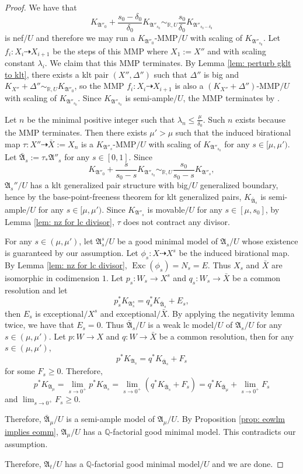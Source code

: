 \documentclass[12pt]{amsart}
\numberwithin{equation}{section}
\newcommand{\Exc}{\operatorname{Exc}}
\newcommand{\Aa}{{\mathfrak{A}}}
\theoremstyle{definition}
\theoremstyle{definition}
\theoremstyle{definition}
\begin{document}
\begin{proof}
We have that $$K_{\Aa''_0}+\frac{s_0-\delta_0}{\delta_0}K_{\Aa''_{s_0}}\sim_{\mathbb R,U}\frac{s_0}{\delta_0}K_{\Aa''_{s_0-\delta_0}}$$
is nef$/U$ and therefore we may
run a
$K_{\Aa''_0}$-MMP$/U$ with scaling of $K_{\Aa''_{s_0}}$. 
  Let $f_i: X_i\dashrightarrow X_{i+1}$ be the steps of this MMP where $X_1:=X''$ and with scaling constant $\lambda_i$. We claim that this MMP terminates. By Lemma \ref{lem: perturb gklt to klt}, there exists a klt pair $(X'',\Delta'')$ such that $\Delta''$ is big and $K_{X''}+\Delta''\sim_{\mathbb R,U}K_{\Aa''_0}$, so the MMP $f_i: X_i\dashrightarrow X_{i+1}$ is also a $(K_{X''}+\Delta'')$-MMP$/U$ with scaling of $K_{\Aa''_{s_0}}$. Since $K_{\Aa''_{s_0}}$ is semi-ample$/U$, the MMP terminates by \cite[Corollary 1.4.2]{BCHM10}.

Let $n$ be the minimal positive integer such that $\lambda_n\leq \frac{\mu}{\delta_0}$. Such $n$ exists because the MMP terminates. Then there exists $\mu'>\mu$ such that the induced birational map $\tau: X''\dashrightarrow \bar X:=X_n$ is a $K_{\Aa''_s}$-MMP$/U$ with scaling of $K_{\Aa''_{s_0}}$ for any $s\in [\mu,\mu')$. Let $\bar\Aa_s:=\tau_*\Aa''_s$ for any $s\in [0,1]$. Since
$$K_{\Aa''_0}+\frac{s}{s_0-s}K_{\Aa''_{s_0}}\sim_{\mathbb R,U}\frac{s_0}{s_0-s}K_{\Aa''_{s}},$$
$\Aa_s''/U$ has a klt generalized pair structure with big$/U$ generalized boundary, hence by the base-point-freeness theorem for klt generalized pairs, $K_{\bar{\Aa}_{s}}$ is semi-ample$/U$ for any $s\in [\mu,\mu')$. Since $K_{\Aa''_s}$ is movable$/U$ for any $s\in [\mu,s_0]$,  by Lemma \ref{lem: nz for lc divisor}, $\tau$ does not contract any divisor. 

For any $s\in (\mu,\mu')$, let $\Aa^s_s/U$ be a good minimal model of $\Aa_s/U$ whose existence is guaranteed by our assumption. Let $\phi_s: X\dashrightarrow X^s$ be the induced birational map. By Lemma \ref{lem: nz for lc divisor}, $\Exc(\phi_s)=N_s=E$. Thus $X_s$ and $\bar X$ are isomorphic in codimension $1$. Let $p_s: W_s\rightarrow X^s$ and $q_s: W_s\rightarrow\bar X$ be a common resolution and let
$$p_s^*K_{\Aa^s_s}=q_s^*K_{\bar\Aa_s}+E_s,$$
then $E_s$ is exceptional$/X^s$ and exceptional$/\bar X$. By applying the negativity lemma twice, we have that $E_s=0$. Thus $\bar\Aa_s/U$ is a weak lc model$/U$ of $\Aa_s/U$ for any $s\in (\mu,\mu')$. Let $p: W\rightarrow X$ and $q: W\rightarrow\bar X$ be a common resolution, then for any $s\in (\mu,\mu')$,
$$p^*K_{\Aa_s}=q^*K_{\bar\Aa_s}+F_s$$
for some $F_s\geq 0$. Therefore,
$$p^*K_{\Aa_\mu}=\lim_{s\rightarrow 0^+}p^*K_{\Aa_s}=\lim_{s\rightarrow 0^+}(q^*K_{\bar\Aa_s}+F_s)=q^*K_{\bar\Aa_{\mu}}+\lim_{s\rightarrow 0^+}F_s$$
and $\lim_{s\rightarrow 0^+}F_s\geq 0$. 

Therefore, $\bar\Aa_{\mu}/U$ is a semi-ample model of $\Aa_{\mu}/U$. By Proposition \ref{prop: eowlm implies eomm}, $\Aa_{\mu}/U$ has a $\mathbb Q$-factorial good minimal model. This contradicts our assumption.

\medskip

Therefore, $\Aa_t/U$ has a $\mathbb Q$-factorial good minimal model$/U$ and we are done.
\end{proof}
\end{document}
